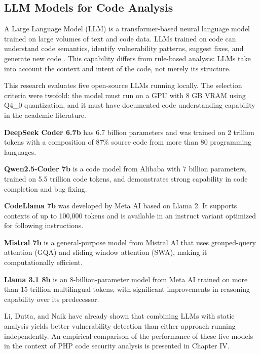 \subsection{LLM Models for Code Analysis}
\label{subsec:model-llm}

A Large Language Model (LLM) is a transformer-based neural language model trained on large volumes of text and code data. LLMs trained on code can understand code semantics, identify vulnerability patterns, suggest fixes, and generate new code \cite{akuthota2023vulnerability}. This capability differs from rule-based analysis: LLMs take into account the context and intent of the code, not merely its structure.

This research evaluates five open-source LLMs running locally. The selection criteria were twofold: the model must run on a GPU with 8 GB VRAM using Q4\_0 quantization, and it must have documented code understanding capability in the academic literature.

\textbf{DeepSeek Coder 6.7b} \cite{deepseek2024coder} has 6.7 billion parameters and was trained on 2 trillion tokens with a composition of 87\% source code from more than 80 programming languages.

\textbf{Qwen2.5-Coder 7b} \cite{hui2024qwen} is a code model from Alibaba with 7 billion parameters, trained on 5.5 trillion code tokens, and demonstrates strong capability in code completion and bug fixing.

\textbf{CodeLlama 7b} \cite{roziere2024codellama} was developed by Meta AI based on Llama 2. It supports contexts of up to 100,000 tokens and is available in an instruct variant optimized for following instructions.

\textbf{Mistral 7b} \cite{jiang2023mistral} is a general-purpose model from Mistral AI that uses grouped-query attention (GQA) and sliding window attention (SWA), making it computationally efficient.

\textbf{Llama 3.1 8b} \cite{dubey2024llama3} is an 8-billion-parameter model from Meta AI trained on more than 15 trillion multilingual tokens, with significant improvements in reasoning capability over its predecessor.

Li, Dutta, and Naik \cite{li2025iris} have already shown that combining LLMs with static analysis yields better vulnerability detection than either approach running independently. An empirical comparison of the performance of these five models in the context of PHP code security analysis is presented in Chapter IV.

